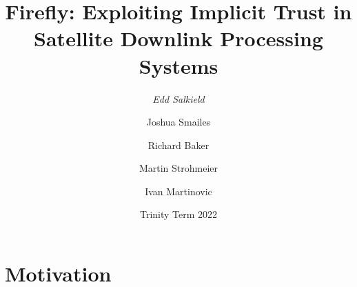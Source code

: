 \documentclass{beamer}
\begin{document}
\title{Firefly: Exploiting Implicit Trust in Satellite Downlink Processing Systems}
\author[Edd Salkield]{
  \emph{Edd Salkield}
  \and
  Joshua Smailes
  \and
  Richard Baker
  \and
  Martin Strohmeier
  \and
  Ivan Martinovic
}
\date{Trinity Term 2022}

\begin{frame}
  \titlepage
\end{frame}

\section{Motivation}
\end{document}
